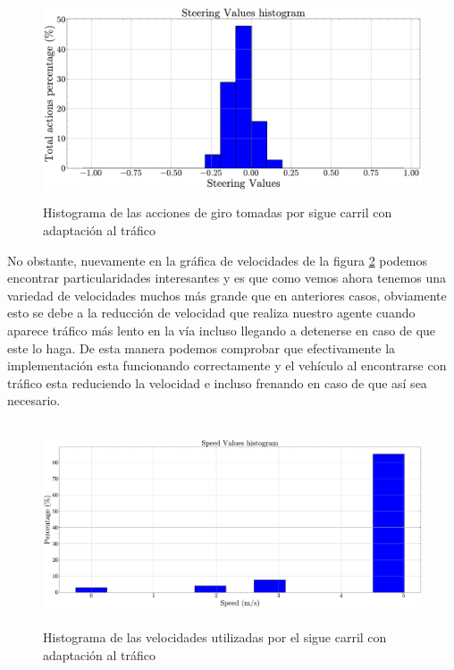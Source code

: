   \begin{figure}[h]
    \centering
    \includegraphics[height=6cm]{imagenes/cap4/adaptacion_trafico_qlearning/actions_traffic.pdf}
    \caption{Histograma de las acciones de giro tomadas por sigue carril con adaptación al tráfico}
    \label{fig:Histograma de las acciones de giro tomadas por el agente de Qlearning en el método de adaptación al tráfico}
\end{figure}

No obstante, nuevamente en la gráfica de velocidades de la figura \ref{fig:Histograma de las velocidades utilizadas por el agente de Qlearning en el método de adaptación al tráfico} podemos encontrar particularidades interesantes y es que como vemos ahora tenemos una variedad de velocidades muchos más grande que en anteriores casos, obviamente esto se debe a la reducción de velocidad que realiza nuestro agente cuando aparece tráfico más lento en la vía incluso llegando a detenerse en caso de que este lo haga. De esta manera podemos comprobar que efectivamente la implementación esta funcionando correctamente y el vehículo al encontrarse con tráfico esta reduciendo la velocidad e incluso frenando en caso de que así sea necesario.

  \begin{figure}[h]
    \centering
    \includegraphics[height=6cm]{imagenes/cap4/adaptacion_trafico_qlearning/traffic_speeds.pdf}
    \caption{Histograma de las velocidades utilizadas por el sigue carril con adaptación al tráfico}
    \label{fig:Histograma de las velocidades utilizadas por el agente de Qlearning en el método de adaptación al tráfico}
\end{figure}


